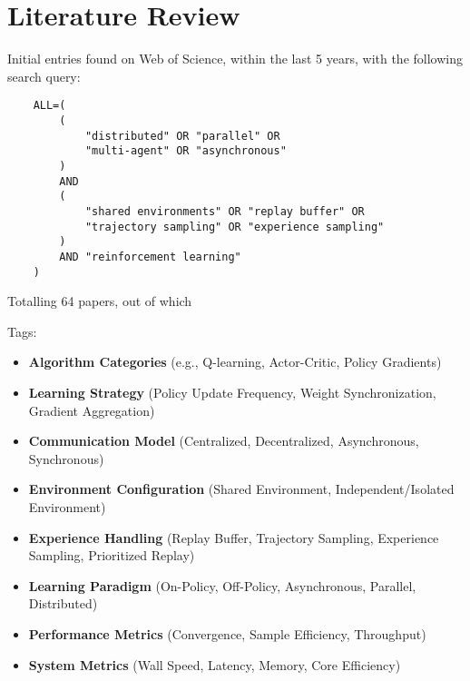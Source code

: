 \section{Literature Review}
\label{sec:literature_review}

Initial entries found on Web of Science, within the last 5 years, with the following search query:

\begin{verbatim}
    ALL=(
        (
            "distributed" OR "parallel" OR
            "multi-agent" OR "asynchronous"
        )
        AND
        (
            "shared environments" OR "replay buffer" OR
            "trajectory sampling" OR "experience sampling"
        )
        AND "reinforcement learning"
    )
\end{verbatim}

Totalling 64 papers, out of which

Tags:


\begin{itemize}[leftmargin=*, label={--}]
    \item \textbf{Algorithm Categories} (e.g., Q-learning, Actor-Critic, Policy Gradients)
    \item \textbf{Learning Strategy} (Policy Update Frequency, Weight Synchronization, Gradient Aggregation)
    \item \textbf{Communication Model} (Centralized, Decentralized, Asynchronous, Synchronous)
    \item \textbf{Environment Configuration} (Shared Environment, Independent/Isolated Environment)
    \item \textbf{Experience Handling} (Replay Buffer, Trajectory Sampling, Experience Sampling, Prioritized Replay)
    \item \textbf{Learning Paradigm} (On-Policy, Off-Policy, Asynchronous, Parallel, Distributed)
    \item \textbf{Performance Metrics} (Convergence, Sample Efficiency, Throughput)
    \item \textbf{System Metrics} (Wall Speed, Latency, Memory, Core Efficiency)
\end{itemize}
